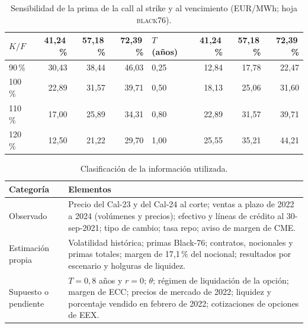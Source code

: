 \documentclass[11pt,letterpaper]{article}
\theoremstyle{plain}
\theoremstyle{definition}
\theoremstyle{remark}
\numberwithin{equation}{section}
\newcommand{\pc}{\mbox{\,\%}}
\begin{document}
\begin{table}[H]
\centering\small
\caption{Sensibilidad de la prima de la call al strike y al vencimiento (EUR/MWh; hoja \textsc{black76}).}\label{tab:sens}
\begin{tabular}{@{}lrrr@{\hspace{1.2cm}}lrrr@{}}
\toprule
$K/F$ & 41,24\pc{} & 57,18\pc{} & 72,39\pc{} & $T$ (años) & 41,24\pc{} & 57,18\pc{} & 72,39\pc{}\\
\midrule
90\pc{} & 30,43 & 38,44 & 46,03 & 0,25 & 12,84 & 17,78 & 22,47\\
100\pc{} & 22,89 & 31,57 & 39,71 & 0,50 & 18,13 & 25,06 & 31,60\\
110\pc{} & 17,00 & 25,89 & 34,31 & 0,80 & 22,89 & 31,57 & 39,71\\
120\pc{} & 12,50 & 21,22 & 29,70 & 1,00 & 25,55 & 35,21 & 44,21\\
\bottomrule
\end{tabular}
\end{table}

\begin{table}[H]
\centering\small
\caption{Clasificación de la información utilizada.}\label{tab:clas}
\begin{tabular}{@{}p{3.2cm}p{12.3cm}@{}}
\toprule
Categoría & Elementos\\
\midrule
Observado & Precio del Cal-23 y del Cal-24 al corte; ventas a plazo de 2022 a 2024 (volúmenes y precios); efectivo y líneas de crédito al 30-sep-2021; tipo de cambio; tasa repo; aviso de margen de CME.\\
Estimación propia & Volatilidad histórica; primas Black-76; contratos, nocionales y primas totales; margen de 17,1\pc{} del nocional; resultados por escenario y holguras de liquidez.\\
Supuesto o pendiente & $T=0{,}8$ años y $r=0$; $\theta$; régimen de liquidación de la opción; margen de ECC; precios de mercado de 2022; liquidez y porcentaje vendido en febrero de 2022; cotizaciones de opciones de EEX.\\
\bottomrule
\end{tabular}
\end{table}
\end{document}

